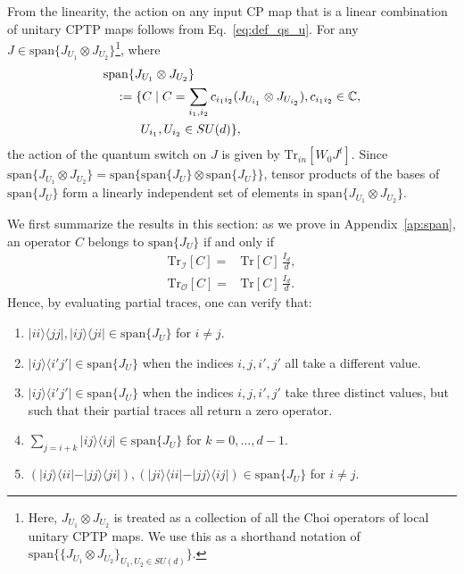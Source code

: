 \documentclass[a4paper,twocolumn,accepted=2022-10-23]{quantumarticle}
\newcommand{\ketbra}[2]{\vert {#1} \rangle\!\langle {#2} \vert}
\newcommand{\Tr}[0]{{\mathrm{Tr}}}
\theoremstyle{definition}
\begin{document}
From the linearity, the action on any input CP map that is a linear combination of unitary CPTP maps follows from Eq.~\eqref{eq:def_qs_u}.
For any $J \in \mathrm{span} \{  J_{U_1} \otimes J_{U_2}  \} $\footnote{Here, $J_{U_1} \otimes J_{U_2}$ is treated as a collection of all the Choi operators of local unitary CPTP maps.  We use this as a shorthand notation of $\mathrm{span} \{ \{ J_{U_1} \otimes J_{U_2} \}_{U_1,U_2 \in SU(d)} \}$.}, where
\begin{align}
&\mathrm{span} \{ J_{U_1} \otimes J_{U_2} \} \\
&\quad:= \{ C \mid C = \sum_{i_1, i_2} c_{i_1 i_2} (J_{U_{i_1}} \otimes J_{U_{i_2}} ), c_{i_1 i_2} \in \mathbb{C}, \notag\\
&\quad\quad\quad U_{i_1},U_{i_2} \in SU(d) \notag  \},
\end{align}
the action of the quantum switch on $J$ is given by $\Tr_{in} [W_0 J^t]$.
Since $\mathrm{span} \{ J_{U_1} \otimes J_{U_2} \} = \mathrm{span} \{ \mathrm{span} \{ J_U \} \otimes \mathrm{span} \{ J_U \} \}$,
tensor products of the bases of $\mathrm{span} \{ J_U \}$ form a linearly independent set of elements in $\mathrm{span} \{ J_{U_1} \otimes J_{U_2} \}$.


We first summarize the results in this section:
as we prove in Appendix~\ref{ap:span}, an operator $C$ belongs to $\mathrm{span} \{ J_U \}$ if and only if
\begin{align} \label{Eqcondition}
	\Tr_{\mathcal{I}}[C]=& \Tr[C] \, \frac{I_d}{d}, \\
	\Tr_{\mathcal{O}}[C]=& \Tr[C] \, \frac{I_d}{d}.
\end{align}
Hence, by evaluating partial traces, one can verify that:
\begin{enumerate}
\item $\ketbra{ii}{jj}, \ketbra{ij}{ji}  \in \mathrm{span} \{ J_U \}$ for  $i \neq j$.
\item $\ketbra{ij}{i'j'} \in \mathrm{span} \{ J_U \}$ when the indices $i,j,i',j'$ all take a different value.
\item $\ketbra{ij}{i'j'} \in \mathrm{span} \{ J_U \}$ when the indices $i,j,i',j'$ take three distinct values, but such that their partial traces all return a zero operator.
\item $\sum_{j=i+k} \ketbra{ij}{ij} \in \mathrm{span} \{ J_U \}$ for $k=0,\ldots,d-1$.
\item $( \ketbra{ij}{ii} - \ketbra{jj}{ji} ) , ( \ketbra{ji}{ii} - \ketbra{jj}{ij} ) \in \mathrm{span} \{ J_U \}$ for $i \neq j$.
\end{enumerate}
\end{document}

